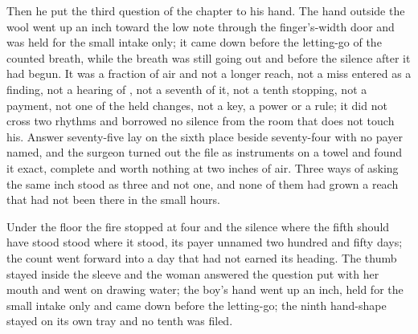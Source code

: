 Then he put the third question of the chapter to his hand. The hand outside the wool went up an inch toward the low note through the finger's-width door and was held for the small intake only; it came down before the letting-go of the counted breath, while the breath was still going out and before the silence after it had begun. It was a fraction of air and not a longer reach, not a miss entered as a finding, not a hearing of , not a seventh of it, not a tenth stopping, not a payment, not one of the held changes, not a key, a power or a rule; it did not cross two rhythms and borrowed no silence from the room that does not touch his. Answer seventy-five lay on the sixth place beside seventy-four with no payer named, and the surgeon turned out the file as instruments on a towel and found it exact, complete and worth nothing at two inches of air. Three ways of asking the same inch stood as three and not one, and none of them had grown a reach that had not been there in the small hours.

Under the floor the fire stopped at four and the silence where the fifth should have stood stood where it stood, its payer unnamed two hundred and fifty days; the count went forward into a day that had not earned its heading. The thumb stayed inside the sleeve and the woman answered the question put with her mouth and went on drawing water; the boy's hand went up an inch, held for the small intake only and came down before the letting-go; the ninth hand-shape stayed on its own tray and no tenth was filed.
